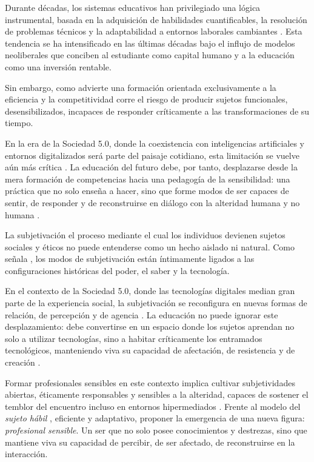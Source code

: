 \documentclass[spanish]{textolivre}
\begin{document}
Durante décadas, los sistemas educativos han privilegiado una lógica instrumental, basada en la adquisición de habilidades cuantificables, la resolución de problemas técnicos y la adaptabilidad a entornos laborales cambiantes \cite{biesta2010}. Esta tendencia se ha intensificado en las últimas décadas bajo el influjo de modelos neoliberales que conciben al estudiante como capital humano y a la educación como una inversión rentable.

Sin embargo, como advierte \textcite{dussel2014} una formación orientada exclusivamente a la eficiencia y la competitividad corre el riesgo de producir sujetos funcionales, desensibilizados, incapaces de responder críticamente a las transformaciones de su tiempo. 

En la era de la Sociedad 5.0, donde la coexistencia con inteligencias artificiales y entornos digitalizados será parte del paisaje cotidiano, esta limitación se vuelve aún más crítica \cite{mishra2022}. La educación del futuro debe, por tanto, desplazarse desde la mera formación de competencias hacia una pedagogía de la sensibilidad: una práctica que no solo enseña a hacer, sino que forme modos de ser capaces de sentir, de responder y de reconstruirse en diálogo con la alteridad humana y no humana \cite{vilarroig2023}.

La subjetivación el proceso mediante el cual los individuos devienen sujetos sociales y éticos no puede entenderse como un hecho aislado ni natural. Como señala \textcite{foucault1982}, los modos de subjetivación están íntimamente ligados a las configuraciones históricas del poder, el saber y la tecnología. 

En el contexto de la Sociedad 5.0, donde las tecnologías digitales median gran parte de la experiencia social, la subjetivación se reconfigura en nuevas formas de relación, de percepción y de agencia \cite{rojas2024}. La educación no puede ignorar este desplazamiento: debe convertirse en un espacio donde los sujetos aprendan no solo a utilizar tecnologías, sino a habitar críticamente los entramados tecnológicos, manteniendo viva su capacidad de afectación, de resistencia y de creación \cite{jimenezperez2023}.

Formar profesionales sensibles en este contexto implica cultivar subjetividades abiertas, éticamente responsables y sensibles a la alteridad, capaces de sostener el temblor del encuentro incluso en entornos hipermediados \cite{montaner2020}. Frente al modelo del \textit{sujeto hábil} \cite{arendt2024}, eficiente y adaptativo, proponer la emergencia de una nueva figura: \textit{profesional sensible}. Un ser que no solo posee conocimientos y destrezas, sino que mantiene viva su capacidad de percibir, de ser afectado, de reconstruirse en la interacción.
\end{document}
